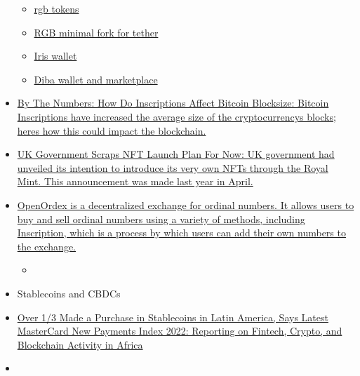 \begin{itemize}
  \begin{itemize}
   
  \item
    \href{https://twitter.com/iris_wallet/status/1639189676845047808}{rgb
    tokens}
  \item
    \href{https://t.me/rgbtelegram/36013}{RGB minimal fork for tether}
  \item
    \href{https://play.google.com/store/apps/details?id=com.iriswallet.testnet}{Iris
    wallet}
  \item
    \href{https://diba.io/}{Diba wallet and marketplace}
  \end{itemize}
\item
  \href{https://bitcoinist.com/the-numbers-inscriptions-affect-bitcoin-blocksize/}{By
  The Numbers: How Do Inscriptions Affect Bitcoin Blocksize: Bitcoin
  Inscriptions have increased the average size of the
  cryptocurrency\textquotesingle s blocks; here\textquotesingle s how
  this could impact the blockchain.}
\item
  \href{https://bitcoinist.com/uk-government-scraps-nft-launch-plan-for-now/}{UK
  Government Scraps NFT Launch Plan For Now: UK government had unveiled
  its intention to introduce its very own NFTs through the Royal Mint.
  This announcement was made last year in April.}
\item
  \href{https://openordex.org/}{OpenOrdex is a decentralized exchange
  for ordinal numbers. It allows users to buy and sell ordinal numbers
  using a variety of methods, including Inscription, which is a process
  by which users can add their own numbers to the exchange.}
  \begin{itemize}
  \item
  \end{itemize}
\item
  Stablecoins and CBDCs
\item
  \href{https://bitcoinke.io/2022/07/latin-america-in-mastercard-new-payments-index-2022/}{Over
  1/3 Made a Purchase in Stablecoins in Latin America, Says Latest
  MasterCard New Payments Index 2022: Reporting on Fintech, Crypto, and
  Blockchain Activity in Africa}
\item
  \begin{itemize}
   

\end{itemize}
\end{itemize}
